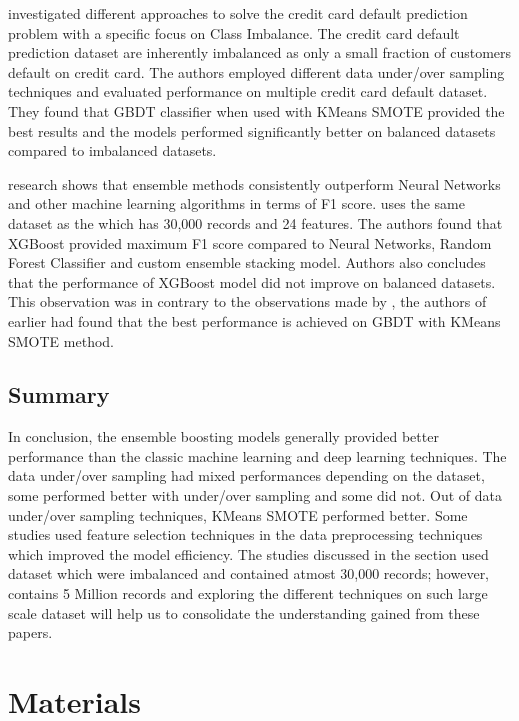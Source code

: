 \documentclass[twoside,11pt,a4paper]{article}
\begin{document}
\citep{alam2020investigation} investigated different approaches to solve the credit card default prediction problem with a specific focus on Class Imbalance. The credit card default prediction dataset are inherently imbalanced as only a small fraction of customers default on credit card. The authors employed different data under/over sampling techniques and evaluated performance on multiple credit card default dataset. They found that \acs{GBDT} classifier when used with KMeans \acs{SMOTE} provided the best results and the models performed significantly better on balanced datasets compared to imbalanced datasets.

\citep{faraj2021comparison} research shows that ensemble  methods  consistently  outperform  Neural  Networks  and  other  machine  learning algorithms in terms of F1 score. \citep{faraj2021comparison} uses the same dataset as the \citep{sayjadah2018credit} which has 30,000 records and 24 features. The authors found that \acs{XGBoost} provided maximum F1 score compared to Neural Networks, Random Forest Classifier and custom ensemble stacking model. Authors also concludes that the performance of \acs{XGBoost} model did not improve on balanced datasets. This observation was in contrary to the observations made by \citep{emil2019enhancing}, the authors of earlier had found that the best performance is achieved on \acs{GBDT} with KMeans \acs{SMOTE} method.

\subsection{Summary}
In conclusion, the ensemble boosting models generally provided better performance than the classic machine learning and deep learning techniques. The data under/over sampling had mixed performances depending on the dataset, some performed better with under/over sampling and some did not. Out of data under/over sampling techniques, KMeans \acs{SMOTE} performed better. Some studies used feature selection techniques in the data preprocessing techniques which improved the model efficiency. The studies discussed in the section used dataset which were imbalanced and  contained atmost 30,000 records; however, \citep{amex-default-prediction-dataset} contains 5 Million records and exploring the different techniques on such large scale dataset will help us to consolidate the understanding gained from these papers.

\vfill
\clearpage
\section{Materials}\label{sec:materials}
\end{document}
